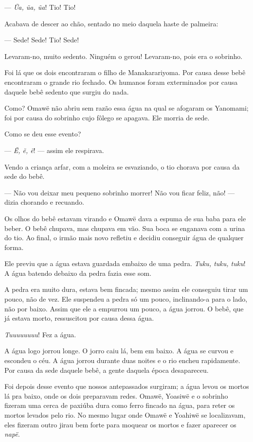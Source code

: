 --- \textit{Ũa, ũa, ũa}! Tio! Tio!

Acabava de descer ao chão, sentado no meio daquela haste de palmeira:

--- Sede! Sede! Tio! Sede!


Levaram-no, muito sedento. Ninguém o gerou! Levaram-no, pois era o
sobrinho. 

Foi lá que os dois encontraram o filho de Manakarariyoma. Por causa
 desse bebê encontraram o grande rio fechado. Os humanos foram
 exterminados por causa daquele bebê sedento que surgiu do nada. 

Como? Omawë não abriu sem razão essa água na qual se afogaram os
Yanomami; foi por causa do sobrinho cujo fôlego se apagava. Ele morria de
sede. 

Como se deu esse evento?

--- \textit{Ẽ, ẽ, ẽ}! --- assim ele respirava. 

Vendo a criança arfar, com a moleira se esvaziando, o tio chorava por
causa da sede do bebê. 

--- Não vou deixar meu pequeno sobrinho morrer! Não vou ficar feliz,
não! --- dizia chorando e recuando. 

Os olhos do bebê estavam virando e Omawë dava a espuma de sua baba para
ele beber. O bebê chupava, mas chupava em vão. Sua boca se enganava com a
urina do tio. Ao final, o irmão mais novo refletiu e decidiu conseguir água de qualquer forma. 

Ele previu que a água estava guardada embaixo de uma pedra. \textit{Tuku, tuku, tuku}! A água batendo debaixo da pedra fazia esse som. 

A pedra era muito dura, estava bem fincada; mesmo assim ele conseguiu
tirar um pouco, não de vez. Ele suspendeu a pedra só um pouco,
inclinando-a para o lado, não por baixo. Assim que ele a empurrou um pouco, a
água jorrou. O bebê, que já estava morto, ressuscitou por causa dessa
água.

\textit{Tuuuuuuuu}! Fez a água. 

A água logo jorrou longe. O jorro caiu lá, bem em baixo. A água se
curvou e escondeu o céu. A água jorrou durante duas noites e o rio
encheu rapidamente. Por causa da sede daquele bebê, a gente daquela
época desapareceu. 

Foi depois desse evento que nossos antepassados surgiram; a água levou
os mortos lá pra baixo, onde os dois preparavam redes. Omawë, Yoasiwë e o
sobrinho fizeram uma cerca de paxiúba dura como ferro fincado na água,
para reter os mortos levados pelo rio. No mesmo lugar onde Omawë e
Yoahiwë se localizavam, eles fizeram outro jirau bem forte para moquear
os mortos e fazer aparecer os \textit{napë}. 

